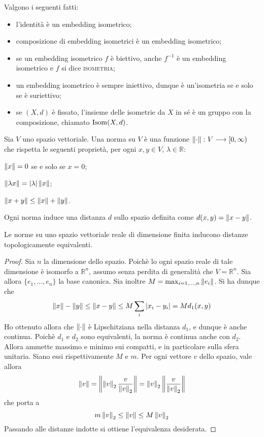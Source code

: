\begin{oss}
    Valgono i seguenti fatti:
    \begin{itemize}
        \item l'identità è un embedding isometrico;
        \item composizione di embedding isometrici è un embedding isometrico;
        \item se un embedding isometrico $f$ è biettivo, anche $f^{-1}$ è un
        embedding isometrico e $f$ si dice \textsc{isometria};
        \item un embedding isometrico è sempre iniettivo, dunque è un'isometria
        se e solo se è suriettivo;
        \item se $(X, d)$ è fissato, l'insieme delle isometrie da $X$ in sé è un
        gruppo con la composizione, chiamato $\operatorname{Isom} (X,d)$.
    \end{itemize}
\end{oss}

\begin{defn}
    Sia $V$ uno spazio vettoriale. Una norma su $V$ \`e una funzione ${\left\lVert \cdot \right\rVert\colon V \longrightarrow [0, \infty)}$ che rispetta le seguenti propriet\`a, per ogni $x, y \in V$, $\lambda \in \mathbb{R}$:
    \begin{nlist}
        \item $\left\lVert x \right\rVert = 0$ se e solo se $x=0$;
        \item $\left\lVert \lambda x \right\rVert = |\lambda|\left\lVert x \right\rVert$;
        \item $\left\lVert x+y \right\rVert \leq \left\lVert x \right\rVert+\left\lVert y \right\rVert$.
    \end{nlist}
    Ogni norma induce una distanza $d$ sullo spazio definita come ${d(x,y)=\left\lVert x-y \right\rVert}$.
\end{defn}

\begin{thm}
Le norme su uno spazio vettoriale reale di dimensione finita inducono distanze topologicamente equivalenti.
\end{thm}
\begin{proof}
    Sia $n$ la dimensione dello spazio. Poich\`e lo ogni spazio reale di tale dimensione \`e isomorfo a $\mathbb{R}^n$, assumo senza perdita di generalit\`a che $V=\mathbb{R}^n$. Sia allora $\{e_1, \dots, e_n\}$ la base canonica. Sia inoltre $M = \max_{i = 1, \dots, n}\left\lVert e_i \right\rVert$. Si ha dunque che
    \[
        \left\lVert x \right\rVert-\left\lVert y \right\rVert \leq \left\lVert x-y \right\rVert \leq M \sum_i |x_i-y_i| = M d_1(x,y)
    \]
    Ho ottenuto allora che $\left\lVert \cdot \right\rVert$ \`e Lipschitziana nella distanza $d_1$, e dunque \`e anche continua. Poich\`e $d_1$ e $d_2$ sono equivalenti, la norma \`e continua anche con $d_2$. Allora ammette massimo e minimo sui compatti, e in particolare sulla sfera unitaria. Siano essi rispettivamente $M$ e $m$. Per ogni vettore $v$ dello spazio, vale allora
    \[
        \left\lVert v \right\rVert = \left\lVert \left\lVert v \right\rVert_2 \frac{v}{\left\lVert v \right\rVert_2} \right\rVert = \left\lVert v \right\rVert_2 \left\lVert \frac{v}{\left\lVert v \right\rVert_2} \right\rVert
    \]
    che porta a
    \[
        m\left\lVert v \right\rVert_2 \leq \left\lVert v \right\rVert \leq M\left\lVert v \right\rVert_2
    \]
    Passando alle distanze indotte si ottiene l'equivalenza desiderata.
\end{proof}
